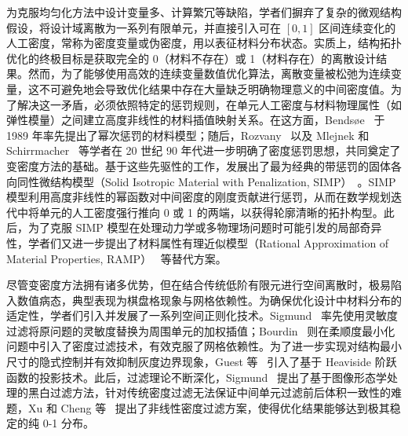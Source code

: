 为克服均匀化方法中设计变量多、计算繁冗等缺陷，学者们摒弃了复杂的微观结构假设，将设计域离散为一系列有限单元，并直接引入可在 $[0,1]$ 区间连续变化的人工密度，常称为密度变量或伪密度，用以表征材料分布状态。实质上，结构拓扑优化的终极目标是获取完全的 0（材料不存在）或 1（材料存在）的离散设计结果。然而，为了能够使用高效的连续变量数值优化算法，离散变量被松弛为连续变量，这不可避免地会导致优化结果中存在大量缺乏明确物理意义的中间密度值。为了解决这一矛盾，必须依照特定的惩罚规则，在单元人工密度与材料物理属性（如弹性模量）之间建立高度非线性的材料插值映射关系。在这方面，Bendsøe~\cite{bendsoeOptimalShapeDesign1989a} 于 1989 年率先提出了幂次惩罚的材料模型；随后，Rozvany~\cite{rozvanyGeneralizedShapeOptimization1992} 以及 Mlejnek 和 Schirrmacher~\cite{mlejnekEngineersApproachOptimal1993} 等学者在 20 世纪 90 年代进一步明确了密度惩罚思想，共同奠定了变密度方法的基础。基于这些先驱性的工作，发展出了最为经典的带惩罚的固体各向同性微结构模型（Solid Isotropic Material with Penalization, SIMP）~\cite{bendsoeMaterialInterpolationSchemes1999, bendsoeTopologyOptimization2004a}。SIMP 模型利用高度非线性的幂函数对中间密度的刚度贡献进行惩罚，从而在数学规划迭代中将单元的人工密度强行推向 0 或 1 的两端，以获得轮廓清晰的拓扑构型。此后，为了克服 SIMP 模型在处理动力学或多物理场问题时可能引发的局部奇异性，学者们又进一步提出了材料属性有理近似模型（Rational Approximation of Material Properties, RAMP）~\cite{stolpeAlternativeInterpolationScheme2001a} 等替代方案。

尽管变密度方法拥有诸多优势，但在结合传统低阶有限元进行空间离散时，极易陷入数值病态，典型表现为棋盘格现象与网格依赖性。为确保优化设计中材料分布的适定性，学者们引入并发展了一系列空间正则化技术。Sigmund~\cite{sigmundDesignCompliantMechanisms1997a, sigmundNumericalInstabilitiesTopology1998} 率先使用灵敏度过滤将原问题的灵敏度替换为周围单元的加权插值；Bourdin~\cite{bourdinFiltersTopologyOptimization2001} 则在柔顺度最小化问题中引入了密度过滤技术，有效克服了网格依赖性。为了进一步实现对结构最小尺寸的隐式控制并有效抑制灰度边界现象，Guest 等~\cite{guestAchievingMinimumLength2004b} 引入了基于 Heaviside 阶跃函数的投影技术。此后，过滤理论不断深化，Sigmund~\cite{sigmundMorphologybasedBlackWhite2007b} 提出了基于图像形态学处理的黑白过滤方法，针对传统密度过滤无法保证中间单元过滤前后体积一致性的难题，Xu 和 Cheng 等~\cite{xuVolumePreservingNonlinear2010} 提出了非线性密度过滤方案，使得优化结果能够达到极其稳定的纯 0-1 分布。

